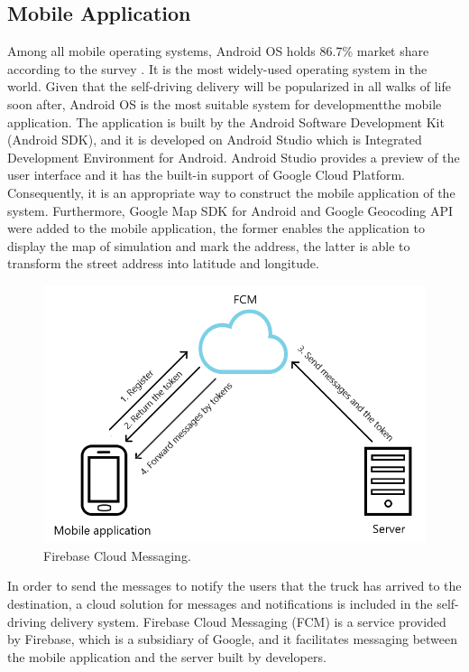 \documentclass[12pt]{ksthesis}
\begin{document}
\begin{thesis}
{\section{Mobile Application}


Among all mobile operating systems, Android OS holds 86.7\% market share according to the survey \cite{SmartphoneOS}. It is the most widely-used operating system in the world. Given that the self-driving delivery will be popularized in all walks of life soon after, Android OS is the most suitable system for developmentthe mobile application. The application is built by the Android Software Development Kit (Android SDK), and it is developed on Android Studio which is Integrated Development Environment for Android. Android Studio provides a preview of the user interface and it has the built-in support of Google Cloud Platform. Consequently, it is an appropriate way to construct the mobile application of the system. Furthermore, Google Map SDK for Android and Google Geocoding API were added to the mobile application, the former enables the application to display the map of simulation and mark the address, the latter is able to transform the street address into latitude and longitude.

\begin{figure}[H]
\centering
\includegraphics[width=1.0\textwidth]{./figures/F4-1_FCM.PNG}
\caption{\large Firebase Cloud Messaging.}
\vspace{0.5cm}
\label{Fig:FCM}
\end{figure}

In order to send the messages to notify the users that the truck has arrived to the destination, a cloud solution for messages and notifications is included in the self-driving delivery system. Firebase Cloud Messaging (FCM) is a service provided by Firebase, which is a subsidiary of Google, and it facilitates messaging between the mobile application and the server built by developers. 

}
\end{thesis}
\end{document}
